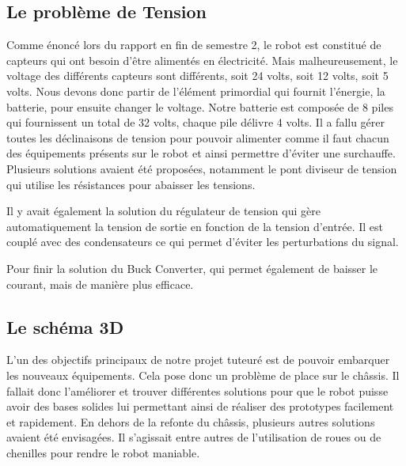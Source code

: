 \subsection{Le problème de Tension}

Comme énoncé lors du rapport en fin de semestre 2, le robot est constitué de capteurs qui ont besoin d’être alimentés en électricité. Mais malheureusement, le voltage des différents capteurs sont différents, soit 24 volts, soit 12 volts, soit 5 volts.
Nous devons donc partir de l’élément primordial qui fournit l’énergie, la batterie, pour ensuite changer le voltage. Notre batterie est composée de 8 piles qui fournissent un total de 32 volts, chaque pile délivre 4 volts.
Il a fallu gérer toutes les déclinaisons de tension pour pouvoir alimenter comme il faut chacun des équipements présents sur le robot et ainsi permettre d'éviter une surchauffe.\\

Plusieurs solutions avaient été proposées, notamment le pont diviseur de tension qui utilise les résistances pour abaisser les tensions.


Il y avait également la solution du régulateur de tension qui gère automatiquement la tension de sortie en fonction de la tension d’entrée. Il est couplé avec des condensateurs ce qui permet d'éviter les perturbations du signal.


Pour finir la solution du Buck Converter, qui permet également de baisser le courant, mais de manière plus efficace. 


\subsection{Le schéma 3D}

L’un des objectifs principaux de notre projet tuteuré est de pouvoir embarquer les nouveaux équipements. Cela pose donc un problème de place sur le châssis. Il fallait donc l’améliorer et trouver différentes solutions pour que le robot puisse avoir des bases solides lui permettant ainsi de réaliser des prototypes facilement et rapidement.
En dehors de la refonte du châssis, plusieurs autres solutions avaient été envisagées. Il s’agissait entre autres de l’utilisation de roues ou de chenilles pour rendre le robot maniable.


